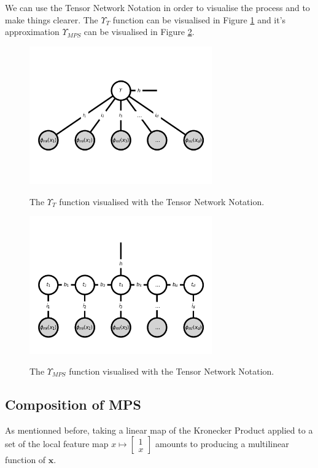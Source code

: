 \documentclass{article}
\theoremstyle{definition}
\theoremstyle{definition}
\begin{document}
We can use the Tensor Network Notation in order to visualise the process and to make things clearer. The $\Upsilon_T$ function can be visualised in Figure \ref{fig:full_tensor_model} and it's approximation $\Upsilon_{MPS}$ can be visualised in Figure \ref{fig:mps_tensor_model}.
\begin{figure}[hbt!]
    \centering
    \caption{The $\Upsilon_T$ function visualised with the Tensor Network Notation.}
    \includegraphics[width=0.7\textwidth]{images/2023-04-20-11-02-45.png}
    \label{fig:full_tensor_model}
\end{figure}

\begin{figure}[hbt!]
    \centering
    \caption{The $\Upsilon_{MPS}$ function visualised with the Tensor Network Notation.}
    \includegraphics[width=0.7\textwidth]{images/2023-04-20-12-41-57.png}
    \label{fig:mps_tensor_model}
\end{figure}

\subsection{Composition of MPS}
As mentionned before, taking a linear map of the Kronecker Product applied to a set of the local feature map 
$ x \mapsto \begin{bmatrix} 1 \\ x \end{bmatrix} $ amounts to producing a multilinear function of $\mathbf{x}$.
\end{document}
